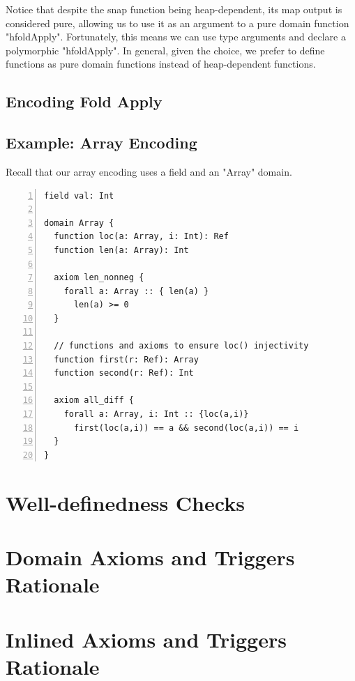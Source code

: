\documentclass[msc,oneside]{ubcthesis}
\begin{document}
Notice that despite the snap function being heap-dependent, its map output is considered pure, allowing us to use it as an argument to a pure domain function "hfoldApply". Fortunately, this means we can use type arguments and declare a polymorphic "hfoldApply". In general, given the choice, we prefer to define functions as pure domain functions instead of heap-dependent functions. 

\subsection{Encoding Fold Apply}



\subsection{Example: Array Encoding}
Recall that our array encoding uses a field and an "Array" domain. 
\begin{lstlisting}[language=silver,numbers=left, firstnumber=1, stepnumber=1]
field val: Int

domain Array {
  function loc(a: Array, i: Int): Ref
  function len(a: Array): Int

  axiom len_nonneg {
    forall a: Array :: { len(a) }
      len(a) >= 0
  }

  // functions and axioms to ensure loc() injectivity
  function first(r: Ref): Array
  function second(r: Ref): Int  

  axiom all_diff {
    forall a: Array, i: Int :: {loc(a,i)}
      first(loc(a,i)) == a && second(loc(a,i)) == i
  }
}
\end{lstlisting}







\section{Well-definedness Checks}

\section{Domain Axioms and Triggers Rationale}

\section{Inlined Axioms and Triggers Rationale}
\end{document}
